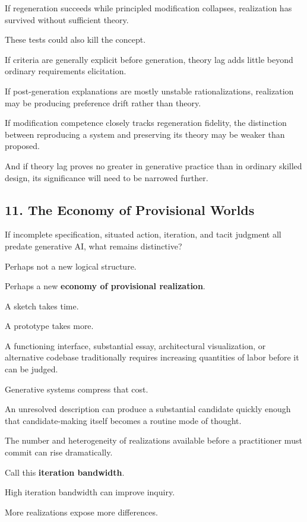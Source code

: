 \documentclass[
]{article}
\begin{document}
If regeneration succeeds while principled modification collapses,
realization has survived without sufficient theory.

These tests could also kill the concept.

If criteria are generally explicit before generation, theory lag adds
little beyond ordinary requirements elicitation.

If post-generation explanations are mostly unstable rationalizations,
realization may be producing preference drift rather than theory.

If modification competence closely tracks regeneration fidelity, the
distinction between reproducing a system and preserving its theory may
be weaker than proposed.

And if theory lag proves no greater in generative practice than in
ordinary skilled design, its significance will need to be narrowed
further.

\subsection{11. The Economy of Provisional
Worlds}\label{the-economy-of-provisional-worlds}

If incomplete specification, situated action, iteration, and tacit
judgment all predate generative AI, what remains distinctive?

Perhaps not a new logical structure.

Perhaps a new \textbf{economy of provisional realization}.

A sketch takes time.

A prototype takes more.

A functioning interface, substantial essay, architectural visualization,
or alternative codebase traditionally requires increasing quantities of
labor before it can be judged.

Generative systems compress that cost.

An unresolved description can produce a substantial candidate quickly
enough that candidate-making itself becomes a routine mode of thought.

The number and heterogeneity of realizations available before a
practitioner must commit can rise dramatically.

Call this \textbf{iteration bandwidth}.

High iteration bandwidth can improve inquiry.

More realizations expose more differences.
\end{document}

